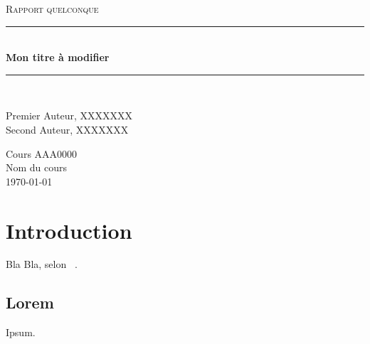 \documentclass[letterpaper,12pt,final]{article}
\newcommand{\HRule}{\rule{\linewidth}{0.5mm}}
\newcommand{\monTypeDeRapport}{Rapport quelconque}
\newcommand{\monTitre}{Mon titre à modifier}
\newcommand{\mesAuteursX}{Premier Auteur, XXXXXXX \\ Second Auteur, XXXXXXX}
\newcommand{\monCoursX}{AAA0000}
\newcommand{\monCours}{Nom du cours}
\begin{document}
    \begin{titlepage}
      \begin{center}

        \begin{doublespace}

          \vspace*{\fill}
          \textsc{ \large \monTypeDeRapport}
          \vspace*{\fill}

          \HRule \\ [5mm]
          {\huge \bfseries \monTitre}\\ [3mm]
          \HRule \\
          \vspace*{\fill}

          \begin{onehalfspace} \large
            \mesAuteursX
          \end{onehalfspace}

          \vfill
          { \Large Cours \monCoursX \\ \monCours } \\

          \today

        \end{doublespace}
      \end{center}
    \end{titlepage}

\newpage

\tableofcontents\newpage

\section{Introduction}

Bla Bla, selon ~\citet{Personne00}.

\subsection{Lorem}

Ipsum.



\end{document}
